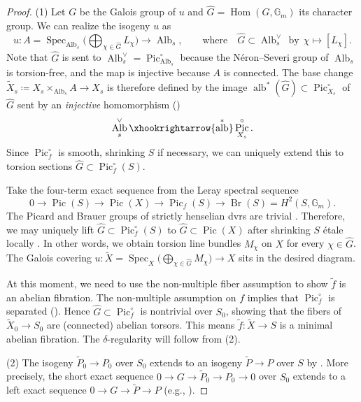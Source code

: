 \documentclass[reqno, letterpaper]{amsart}
\numberwithin{equation}{subsection}
\let\to\longrightarrow
\let\mapsto\longmapsto
\newcommand{\GG}{\mathbb{G}}
\DeclareMathOperator{\Hom}{Hom}
\DeclareMathOperator{\Spec}{Spec}
\DeclareMathOperator{\Pic}{Pic}
\DeclareMathOperator{\Br}{Br}
\DeclareMathOperator{\Alb}{Alb}
\DeclareMathOperator{\alb}{alb}
\begin{document}
		\begin{proof}
			(1) Let $G$ be the Galois group of $u$ and $\hat G = \Hom(G, \GG_m)$ its character group. We can realize the isogeny $u$ as
			\[ u : A = \Spec_{\Alb_s} \big( \bigoplus_{\chi \in \hat G} L_{\chi} \big) \to \Alb_s ,\qquad\mbox{where}\quad \hat G \subset \Alb_s^\vee \ \ \mbox{by}\ \ \chi \mapsto [L_{\chi}] .\]
			Note that $\hat G$ is sent to $\Alb_s^\vee = \Pic^\circ_{\Alb_s}$ because the N\'eron--Severi group of $\Alb_s$ is torsion-free, and the map is injective because $A$ is connected. The base change $\tilde X_s \coloneq X_s \times_{\Alb_s} A \to X_s$ is therefore defined by the image $\alb^* (\hat G) \subset \Pic^\circ_{X_s}$ of $\hat G$ sent by an \emph{injective} homomorphism ()
			\[ \Alb_s^\vee \xhookrightarrow{\alb^*} \Pic^\circ_{X_s} .\]
			Since $\Pic^\circ_f$ is smooth, shrinking $S$ if necessary, we can uniquely extend this to torsion sections $\hat G \subset \Pic^\circ_f(S)$.
			
			Take the four-term exact sequence from the Leray spectral sequence
			\[ 0 \to \Pic(S) \to \Pic(X) \to \Pic_f(S) \to \Br(S) = H^2 (S, \GG_m) .\]
			The Picard and Brauer groups of strictly henselian dvrs are trivial \cite[Tag~03QO]{stacks-project}. Therefore, we may uniquely lift $\hat G \subset \Pic^\circ_f(S)$ to $\hat G \subset \Pic(X)$ after shrinking $S$ \'etale locally \cite[\S 2.2.2]{col-the-sko:brauer_group}. In other words, we obtain torsion line bundles $M_\chi$ on $X$ for every $\chi \in \hat G$. The Galois covering $u : \tilde X = \Spec_X \big( \bigoplus_{\chi \in \hat G} M_\chi \big) \to X$ sits in the desired diagram.
			
			At this moment, we need to use the non-multiple fiber assumption to show $\tilde f$ is an abelian fibration. The non-multiple assumption on $f$ implies that $\Pic^\circ_f$ is separated (). Hence $\hat G \subset \Pic^\circ_f$ is nontrivial over $S_0$, showing that the fibers of $\tilde X_0 \to S_0$ are (connected) abelian torsors. This means $\tilde f : \tilde X \to S$ is a minimal abelian fibration. The $\delta$-regularity will follow from (2).
			
			\medskip
			
			(2) The isogeny $\tilde P_0 \to P_0$ over $S_0$ extends to an isogeny $\tilde P \to P$ over $S$ by \cite[Proposition~7.3.6]{neron}. More precisely, the short exact sequence $0 \to G \to \tilde P_0 \to P_0 \to 0$ over $S_0$ extends to a left exact sequence $0 \to G \to \tilde P \to P$ (e.g., \cite[Proposition~3.29]{kim24}).
		\end{proof}
		
\end{document}
